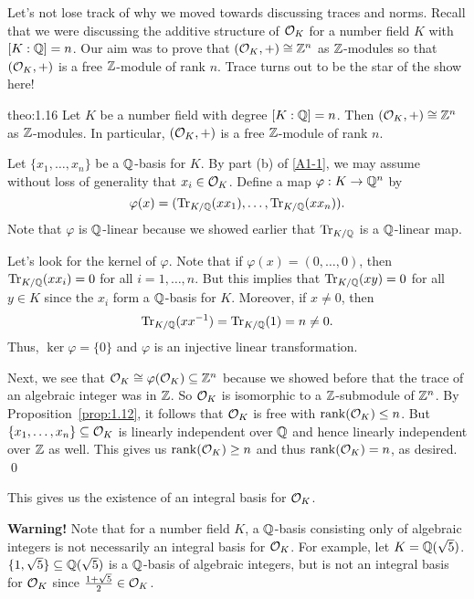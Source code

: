 Let's not lose track of why we moved towards discussing traces and norms. 
Recall that we were discussing the additive structure of ${\cal O}_K$ 
for a number field $K$ with $[K : \mathbb{Q}] = n$. 
Our aim was to prove that $({\cal O}_K, +) \cong \mathbb{Z}^n$ as $\mathbb{Z}$-modules 
so that $({\cal O}_K, +)$ is a free $\mathbb{Z}$-module of rank $n$. Trace turns 
out to be the star of the show here!

\begin{theo}{theo:1.16}
    Let $K$ be a number field with degree $[K : \mathbb{Q}] = n$. Then 
    $({\cal O}_K, +) \cong \mathbb{Z}^n$ as $\mathbb{Z}$-modules. In particular, 
    $({\cal O}_K, +)$ is a free $\mathbb{Z}$-module of rank $n$. 
\end{theo}
\begin{pf}
    Let $\{x_1, \dots, x_n\}$ be a $\mathbb{Q}$-basis for $K$. By part (b) of \ref{A1-1}, 
    we may assume without loss of generality that $x_i \in {\cal O}_K$. Define 
    a map $\varphi : K \to \mathbb{Q}^n$ by 
    \[ \varphi(x) = (\operatorname{Tr}_{K/\mathbb{Q}}(xx_1), \dots, \operatorname{Tr}_{K/\mathbb{Q}}(xx_n)). \] 
    Note that $\varphi$ is $\mathbb{Q}$-linear because we showed earlier that 
    $\operatorname{Tr}_{K/\mathbb{Q}}$ is a $\mathbb{Q}$-linear map. 

    Let's look for the kernel of $\varphi$. Note that if $\varphi(x) = 
    (0, \dots, 0)$, then $\operatorname{Tr}_{K/\mathbb{Q}}(xx_i) = 0$ for all $i = 1, \dots, n$. 
    But this implies that $\operatorname{Tr}_{K/\mathbb{Q}}(xy) = 0$ for all $y \in K$ since 
    the $x_i$ form a $\mathbb{Q}$-basis for $K$. Moreover, if $x \neq 0$, then
    \[ \operatorname{Tr}_{K/\mathbb{Q}}(xx^{-1}) = \operatorname{Tr}_{K/\mathbb{Q}}(1) = n \neq 0. \] 
    Thus, $\ker\varphi = \{0\}$ and $\varphi$ is an injective linear transformation.

    Next, we see that ${\cal O}_K \cong \varphi({\cal O}_K) \subseteq \mathbb{Z}^n$
    because we showed before that the trace of an algebraic integer 
    was in $\mathbb{Z}$. So ${\cal O}_K$ is isomorphic to a $\mathbb{Z}$-submodule of $\mathbb{Z}^n$. By 
    Proposition~\ref{prop:1.12}, it follows that ${\cal O}_K$ is free 
    with $\operatorname{rank}({\cal O}_K) \leq n$. But $\{x_1, \dots, x_n\} \subseteq 
    {\cal O}_K$ is linearly independent over $\mathbb{Q}$ and hence linearly independent 
    over $\mathbb{Z}$ as well. This gives us $\operatorname{rank}({\cal O}_K) \geq n$ and thus 
    $\operatorname{rank}({\cal O}_K) = n$, as desired. \qed
\end{pf}\vspace{-0.25cm}

This gives us the existence of an integral basis for ${\cal O}_K$. 

{\bf Warning!} Note that for a number field $K$, a $\mathbb{Q}$-basis consisting only of 
algebraic integers is not necessarily an integral basis for ${\cal O}_K$. For 
example, let $K = \mathbb{Q}(\sqrt{5})$. $\{1, \sqrt{5}\} \subseteq 
\mathbb{Q}(\sqrt{5})$ is a $\mathbb{Q}$-basis of algebraic integers, but is not an integral 
basis for ${\cal O}_K$ since $\frac{1+\sqrt{5}}{2} \in {\cal O}_K$. 

